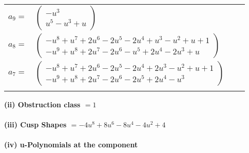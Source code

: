 \documentclass[1p]{elsarticle_modified}
\theoremstyle{definition}
\begin{document}
\begin{tabular}{m{7pt} m{180pt} m{7pt} m{180pt} }
\flushright $a_{9}=$&$\begin{pmatrix}- u^3\\u^5- u^3+u\end{pmatrix}$ \\
\flushright $a_{8}=$&$\begin{pmatrix}- u^8+u^7+2 u^6-2 u^5-2 u^4+u^3- u^2+u+1\\- u^9+u^8+2 u^7-2 u^6- u^5+2 u^4-2 u^3+u\end{pmatrix}$ \\
\flushright $a_{7}=$&$\begin{pmatrix}- u^8+u^7+2 u^6-2 u^5-2 u^4+2 u^3- u^2+u+1\\- u^9+u^8+2 u^7-2 u^6-2 u^5+2 u^4- u^3\end{pmatrix}$\\&\end{tabular}
\flushleft \textbf{(ii) Obstruction class $= 1$}\\~\\
\flushleft \textbf{(iii) Cusp Shapes $= -4 u^8+8 u^6-8 u^4-4 u^2+4$}\\~\\
\newpage\renewcommand{\arraystretch}{1}
\flushleft \textbf{(iv) u-Polynomials at the component}\newline \\
\end{document}
